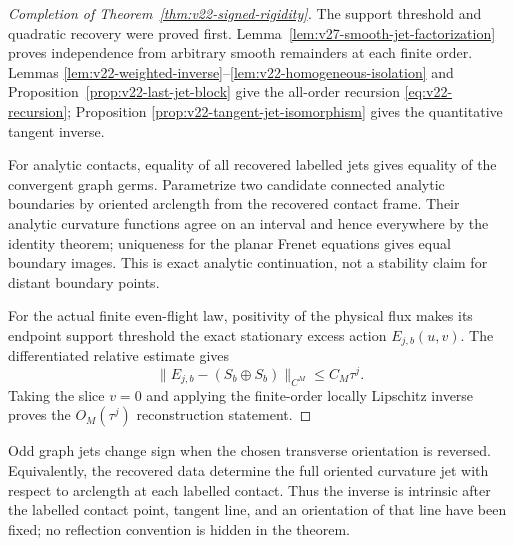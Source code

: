 \begin{proof}[Completion of Theorem~\ref{thm:v22-signed-rigidity}]
The support threshold and quadratic recovery were proved first.
Lemma~\ref{lem:v27-smooth-jet-factorization} proves independence from
arbitrary smooth remainders at each finite order.  Lemmas
\ref{lem:v22-weighted-inverse}--\ref{lem:v22-homogeneous-isolation} and
Proposition~\ref{prop:v22-last-jet-block} give the all-order recursion
\eqref{eq:v22-recursion}; Proposition
\ref{prop:v22-tangent-jet-isomorphism} gives the quantitative tangent inverse.

For analytic contacts, equality of all recovered labelled jets gives equality
of the convergent graph germs.  Parametrize two candidate connected analytic
boundaries by oriented arclength from the recovered contact frame.  Their
analytic curvature functions agree on an interval and hence everywhere by
the identity theorem; uniqueness for the planar Frenet equations gives equal
boundary images.  This is exact analytic continuation, not a stability claim
for distant boundary points.

For the actual finite even-flight law, positivity of the physical flux makes
its endpoint support threshold the exact stationary excess action
$E_{j,b}(u,v)$.  The differentiated relative estimate gives
\[
 \|E_{j,b}-(S_b\oplus S_b)\|_{C^M}\le C_M\tau^j.
\]
Taking the slice $v=0$ and applying the finite-order locally Lipschitz inverse
proves the $O_M(\tau^j)$ reconstruction statement.
\end{proof}

\begin{remark}
Odd graph jets change sign when the chosen transverse orientation is
reversed.  Equivalently, the recovered data determine the full oriented
curvature jet with respect to arclength at each labelled contact.  Thus the
inverse is intrinsic after the labelled contact point, tangent line, and an
orientation of that line have been fixed; no reflection convention is hidden
in the theorem.
\end{remark}





